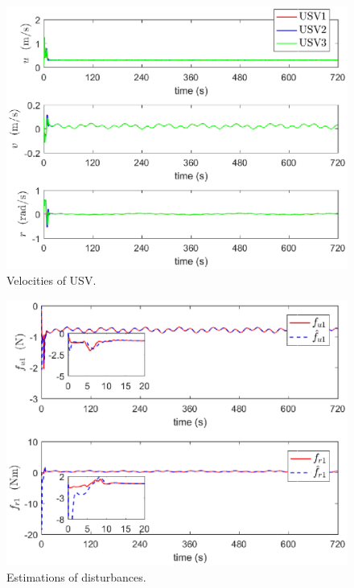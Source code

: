 \documentclass[a4paper,fleqn]{cas-dc}
\begin{document}
\begin{figure}[!htb]
	\centering
	\includegraphics[width=\hsize]{velocity.eps}
	\caption{Velocities of USV.}
	\label{fig5}
\end{figure}
\begin{figure}[!htb]
	\centering
	\includegraphics[width=\hsize]{RBF.eps}
	\caption{Estimations of disturbances.}
	\label{fig6}
\end{figure}
\end{document}
